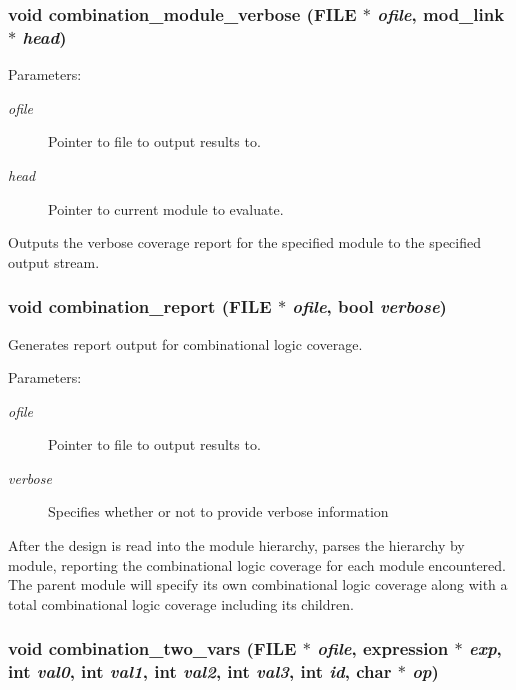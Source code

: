 \subsubsection{\setlength{\rightskip}{0pt plus 5cm}void combination\_\-module\_\-verbose (FILE $\ast$ {\em ofile}, {\bf mod\_\-link} $\ast$ {\em head})}\label{comb_8c_a19}


\begin{Desc}
\item[Parameters:]
\begin{description}
\item[{\em ofile}]Pointer to file to output results to. \item[{\em head}]Pointer to current module to evaluate.\end{description}
\end{Desc}
Outputs the verbose coverage report for the specified module to the specified output stream. 
\subsubsection{\setlength{\rightskip}{0pt plus 5cm}void combination\_\-report (FILE $\ast$ {\em ofile}, {\bf bool} {\em verbose})}\label{comb_8c_a20}


Generates report output for combinational logic coverage.

\begin{Desc}
\item[Parameters:]
\begin{description}
\item[{\em ofile}]Pointer to file to output results to. \item[{\em verbose}]Specifies whether or not to provide verbose information\end{description}
\end{Desc}
After the design is read into the module hierarchy, parses the hierarchy by module, reporting the combinational logic coverage for each module encountered. The parent module will specify its own combinational logic coverage along with a total combinational logic coverage including its children. 
\subsubsection{\setlength{\rightskip}{0pt plus 5cm}void combination\_\-two\_\-vars (FILE $\ast$ {\em ofile}, {\bf expression} $\ast$ {\em exp}, int {\em val0}, int {\em val1}, int {\em val2}, int {\em val3}, int {\em id}, char $\ast$ {\em op})}\label{comb_8c_a14}


